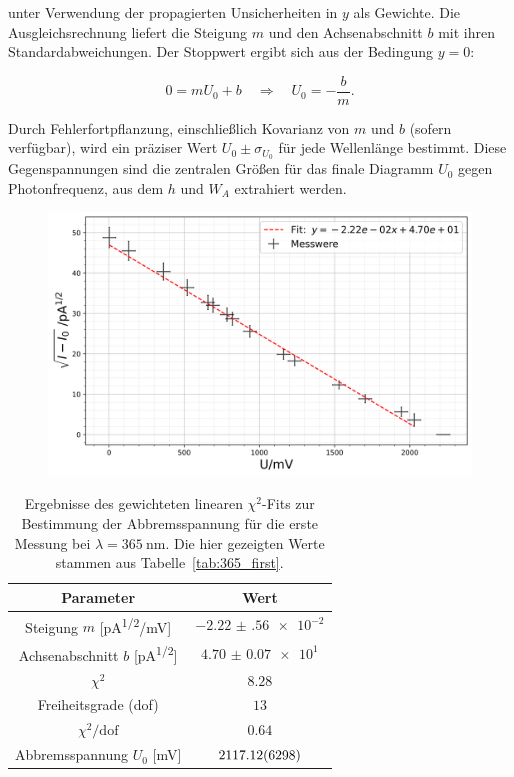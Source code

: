 unter Verwendung der propagierten Unsicherheiten in $y$ als Gewichte. Die Ausgleichsrechnung liefert die Steigung $m$ und den Achsenabschnitt $b$ mit ihren Standardabweichungen. Der Stoppwert ergibt sich aus der Bedingung $y=0$:

\begin{equation}
  0 = m U_{0} + b
  \quad\Longrightarrow\quad
  U_{0} = -\frac{b}{m}.
\end{equation}

Durch Fehlerfortpflanzung, einschließlich Kovarianz von $m$ und $b$ (sofern verfügbar), wird ein präziser Wert $U_{0}\pm\sigma_{U_{0}}$ für jede Wellenlänge bestimmt. Diese Gegenspannungen sind die zentralen Größen für das finale Diagramm $U_{0}$ gegen Photonfrequenz, aus dem $h$ und $W_{A}$ extrahiert werden.
\FloatBarrier
\begin{figure}[H]
    \centering
    \includegraphics[width=0.95\linewidth]{figs/365_1.png}
    \label{fig:365_first_photoeff}
\end{figure}
\begin{table}[H]
  \centering
  \begin{tabular}{|c|c|}
    \hline
    \textbf{Parameter} & \textbf{Wert} \\ \hline
    Steigung $m$ [\si{\pico\ampere^{1/2}/\milli\volt}]
      & $\num{-2.22(56)e-2}$ \\ \hline
    Achsenabschnitt $b$ [\si{\pico\ampere^{1/2}}]
      & $\num{4.70(7)e1}$ \\ \hline
    $\chi^2$
      & $\num{8.28}$ \\ \hline
    Freiheitsgrade (dof)
      & $\num{13}$ \\ \hline
    $\chi^2/\mathrm{dof}$
      & $\num{0.64}$ \\ \hline
    Abbremsspannung $U_0$ [\si{\milli\volt}]
      & $\num{2117.12 \pm 62.98}$ \\ \hline
  \end{tabular}
  \caption{Ergebnisse des gewichteten linearen $\chi^2$-Fits zur Bestimmung der Abbremsspannung für die erste Messung bei $\lambda=\SI{365}{\nano\metre}$. Die hier gezeigten Werte stammen aus Tabelle~\ref{tab:365_first}.}
  \label{tab:365_first_chi2_photoeff}
\end{table}
